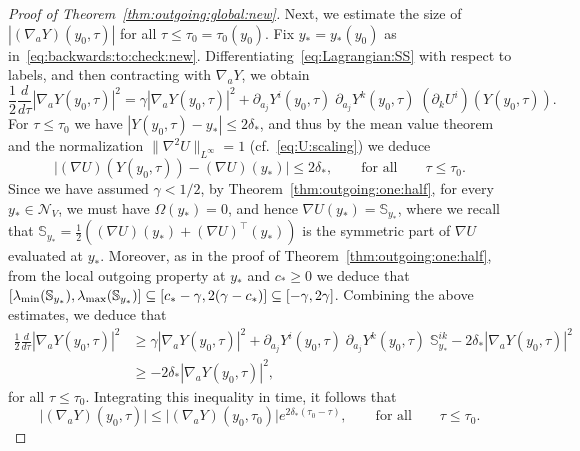 \documentclass[11pt,reqno]{amsproc}
\numberwithin{equation}{section}
\theoremstyle{remark}
\begin{document}
\begin{proof}[Proof of Theorem~\ref{thm:outgoing:global:new}]
Next, we estimate the size of $|(\nabla_a Y)(y_0,\tau)|$ for all $\tau \leq\tau_0=\tau_0(y_0)$. Fix $y_*= y_*(y_0)$ as in~\eqref{eq:backwards:to:check:new}. 
Differentiating~\eqref{eq:Lagrangian:SS} with respect to labels, and then contracting with $\nabla_a Y$, we obtain
\begin{equation*}
\frac 12 \frac{d}{d\tau} |\nabla_a Y(y_0,\tau)|^2 
=  
\gamma |\nabla_a Y(y_0,\tau)|^2 
+
\partial_{a_j}Y^i(y_0,\tau) \; \partial_{a_j}Y^k(y_0,\tau) \; (\partial_k U^i)(Y(y_0,\tau)).
\end{equation*}
For $\tau \leq \tau_0$ we have $|Y(y_0,\tau) - y_*|\leq 2 \delta_*$, and thus by the mean value theorem and the normalization $\|\nabla^2 U\|_{L^\infty} = 1$ (cf.~\eqref{eq:U:scaling}) we deduce 
\[
\bigl| (\nabla U)(Y(y_0,\tau)) - (\nabla U)(y_*)\bigr| \leq 2 \delta_*, 
\qquad \mbox{for all} \qquad
\tau \leq \tau_0.
\]
Since we have assumed $\gamma < 1/2$, by Theorem~\ref{thm:outgoing:one:half}, for every $y_* \in \mathcal{N}_V$, we must have $\Omega(y_*) =0$, and hence  $\nabla U(y_*) =  \mathbb{S}_{y_*}$,
where we recall that $\mathbb{S}_{y_*} = \frac 12 ( (\nabla U)(y_*) + (\nabla U)^\intercal(y_*))$ is the symmetric part of $\nabla U$ evaluated at $y_*$. Moreover, as in the proof of Theorem~\ref{thm:outgoing:one:half}, from the local outgoing property at $y_*$ and $c_* \geq 0$ we deduce that $[\lambda_{\rm min}(\mathbb{S}_{y_*}),\lambda_{\rm max}(\mathbb{S}_{y_*})]\subseteq [c_* - \gamma, 2(\gamma -c_*)]\subseteq [-\gamma,2\gamma]$. Combining the above estimates, we deduce that 
\begin{align*}
\frac 12 \frac{d}{d\tau} |\nabla_a Y(y_0,\tau)|^2 
&\geq  
\gamma |\nabla_a Y(y_0,\tau)|^2 
+
\partial_{a_j}Y^i(y_0,\tau) \; \partial_{a_j}Y^k(y_0,\tau) \; \mathbb{S}_{y_*}^{ik}
- 
2 \delta_* |\nabla_a Y(y_0,\tau)|^2 
\\
&\geq 
- 
2 \delta_* |\nabla_a Y(y_0,\tau)|^2,
\end{align*}
for all $\tau \leq \tau_0$. Integrating this inequality in time, it follows that 
\begin{equation}
\label{eq:slow:growth:Lag:grad}
\bigl|(\nabla_a Y) (y_0,\tau)\bigr|
\leq 
\bigl|(\nabla_a Y) (y_0,\tau_0)\bigr| e^{2 \delta_*(\tau_0-\tau)},
\qquad\mbox{for all}\qquad
\tau\leq \tau_0.
\end{equation}


\end{proof}
\end{document}
